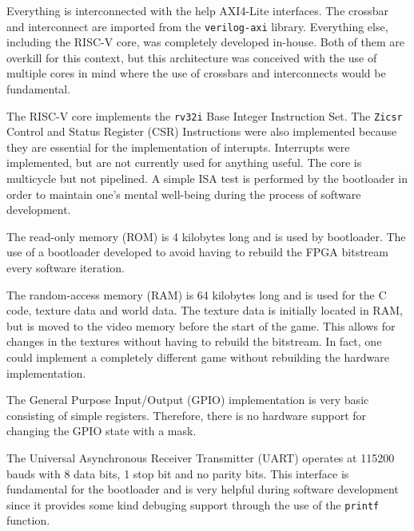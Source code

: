 \documentclass[12pt,a4paper]{article}
\begin{document}
Everything is interconnected with the help AXI4-Lite interfaces. The crossbar
and interconnect are imported from the \texttt{verilog-axi} library.
Everything else, including the RISC-V core, was completely developed in-house.
Both of them are overkill for this context, but this architecture was conceived
with the use of multiple cores in mind where the use of crossbars and
interconnects would be fundamental.

The RISC-V core implements the \texttt{rv32i} Base Integer Instruction Set. The 
\texttt{Zicsr} Control and Status Register (CSR) Instructions were also
implemented because they are essential for the implementation of interupts. 
Interrupts were implemented, but are not currently used for anything useful.
The core is multicycle but not pipelined. A simple ISA test is performed by the
bootloader in order to maintain one's mental well-being during the process of
software development.

The read-only memory (ROM) is 4 kilobytes long and is used by bootloader. The
use of a bootloader developed to avoid having to rebuild the FPGA bitstream 
every software iteration.

The random-access memory (RAM) is 64 kilobytes long and is used for the C code,
texture data and world data. The texture data is initially located in RAM, but
is moved to the video memory before the start of the game. This allows for 
changes in the textures without having to rebuild the bitstream. In fact, one
could implement a completely different game without rebuilding the hardware 
implementation.

The General Purpose Input/Output (GPIO) implementation is very basic consisting
of simple registers. Therefore, there is no hardware support for changing the 
GPIO state with a mask.

The Universal Asynchronous Receiver Transmitter (UART) operates at 115200 bauds
with 8 data bits, 1 stop bit and no parity bits. This interface is fundamental
for the bootloader and is very helpful during software development since it
provides some kind debuging support through the use of the \texttt{printf}
function.
\end{document}

